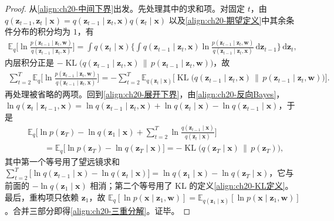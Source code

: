 \documentclass[../../main.tex]{subfiles}
\begin{document}
\begin{proof}
从\eqref{align:ch20-中间下界}出发。先处理其中的求和项。对固定 $t$，由 $q(\bm{z}_{t-1},\bm{z}_t\mid\bm{x})=q(\bm{z}_{t-1}\mid\bm{z}_t,\bm{x})q(\bm{z}_t\mid\bm{x})$ 以及\eqref{align:ch20-期望定义}中其余条件分布的积分均为 $1$，有
\begin{align*}
\mathbb{E}_{q}\Big[\ln\frac{p(\bm{z}_{t-1}\mid\bm{z}_t,\bm{w})}{q(\bm{z}_{t-1}\mid\bm{z}_t,\bm{x})}\Big]=\int q(\bm{z}_t\mid\bm{x})\Big\{\int q(\bm{z}_{t-1}\mid\bm{z}_t,\bm{x})\ln\frac{p(\bm{z}_{t-1}\mid\bm{z}_t,\bm{w})}{q(\bm{z}_{t-1}\mid\bm{z}_t,\bm{x})}\,\mathrm{d}\bm{z}_{t-1}\Big\}\,\mathrm{d}\bm{z}_t,
\end{align*}
内层积分正是 $-\operatorname{KL}\big(q(\bm{z}_{t-1}\mid\bm{z}_t,\bm{x})\,\|\,p(\bm{z}_{t-1}\mid\bm{z}_t,\bm{w})\big)$，故
\begin{align*}
\sum_{t=2}^{T}\mathbb{E}_{q}\Big[\ln\frac{p(\bm{z}_{t-1}\mid\bm{z}_t,\bm{w})}{q(\bm{z}_{t-1}\mid\bm{z}_t,\bm{x})}\Big]=-\sum_{t=2}^{T}\mathbb{E}_{q(\bm{z}_t\mid\bm{x})}\Big[\operatorname{KL}\big(q(\bm{z}_{t-1}\mid\bm{z}_t,\bm{x})\,\|\,p(\bm{z}_{t-1}\mid\bm{z}_t,\bm{w})\big)\Big].
\end{align*}
再处理被省略的两项。回到\eqref{align:ch20-展开下界}，由\eqref{align:ch20-反向Bayes}，$\ln q(\bm{z}_t\mid\bm{z}_{t-1},\bm{x})=\ln q(\bm{z}_{t-1}\mid\bm{z}_t,\bm{x})+\ln q(\bm{z}_t\mid\bm{x})-\ln q(\bm{z}_{t-1}\mid\bm{x})$，于是
\begin{align*}
&\mathbb{E}_{q}\Big[\ln p(\bm{z}_T)-\ln q(\bm{z}_1\mid\bm{x})+\sum_{t=2}^{T}\ln\frac{q(\bm{z}_{t-1}\mid\bm{x})}{q(\bm{z}_t\mid\bm{x})}\Big]\\
&\qquad=\mathbb{E}_{q}\big[\ln p(\bm{z}_T)-\ln q(\bm{z}_T\mid\bm{x})\big]=-\operatorname{KL}\big(q(\bm{z}_T\mid\bm{x})\,\|\,p(\bm{z}_T)\big),
\end{align*}
其中第一个等号用了望远镜求和 $\sum_{t=2}^{T}\big[\ln q(\bm{z}_{t-1}\mid\bm{x})-\ln q(\bm{z}_t\mid\bm{x})\big]=\ln q(\bm{z}_1\mid\bm{x})-\ln q(\bm{z}_T\mid\bm{x})$，它与前面的 $-\ln q(\bm{z}_1\mid\bm{x})$ 相消；第二个等号用了 KL 的定义\eqref{align:ch20-KL定义}。最后，重构项只依赖 $\bm{z}_1$，故 $\mathbb{E}_q[\ln p(\bm{x}\mid\bm{z}_1,\bm{w})]=\mathbb{E}_{q(\bm{z}_1\mid\bm{x})}[\ln p(\bm{x}\mid\bm{z}_1,\bm{w})]$。合并三部分即得\eqref{align:ch20-三重分解}。证毕。
\end{proof}
\end{document}
